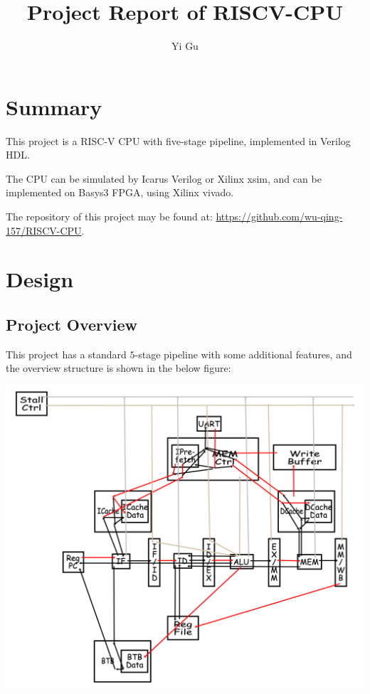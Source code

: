 \documentclass{article}
\title{Project Report of RISCV-CPU}
\author{Yi Gu}
\begin{document}
    \maketitle

    \section{Summary}

        This project is a RISC-V CPU with five-stage pipeline, implemented in Verilog HDL.

        The CPU can be simulated by Icarus Verilog or Xilinx xsim, and can be implemented on Basys3 FPGA, using Xilinx vivado.

        The repository of this project may be found at: \url{https://github.com/wu-qing-157/RISCV-CPU}.

    \section{Design}

        \subsection{Project Overview}

            This project has a standard $5$-stage pipeline with some additional features, and the overview structure is shown in the below figure:

            \begin{center}
                \includegraphics[scale=0.7]{Overview.png}
            \end{center}
\end{document}
